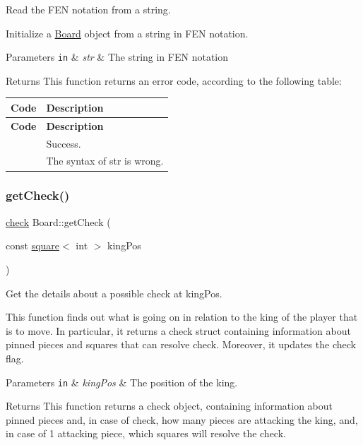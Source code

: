 Read the F\+EN notation from a string. 

Initialize a \hyperlink{classBoard}{Board} object from a string in F\+EN notation. 
\begin{DoxyParams}[1]{Parameters}
\mbox{\tt in}  & {\em str} & The string in F\+EN notation \\
\hline
\end{DoxyParams}
\begin{DoxyReturn}{Returns}
This function returns an error code, according to the following table\+: \tabulinesep=1mm
\begin{longtabu} spread 0pt [c]{*{2}{|X[-1]}|}
\hline
\rowcolor{\tableheadbgcolor}\PBS\raggedleft \textbf{ Code }&\textbf{ Description  }\\
\endfirsthead
\hline
\endfoot
\hline
\rowcolor{\tableheadbgcolor}\PBS\raggedleft \textbf{ Code }&\textbf{ Description  }\\
\endhead
\PBS{} &Success. \\
\PBS{} &The syntax of str is wrong. \\
\end{longtabu}

\end{DoxyReturn}
\mbox{\label{classBoard_afc291baf2c205a64255e8e55ffeff004}} 
\subsubsection{\texorpdfstring{get\+Check()}{getCheck()}}
{\footnotesize\ttfamily \hyperlink{structcheck}{check} Board\+::get\+Check (\begin{DoxyParamCaption}\item[{const \hyperlink{structsquare}{square}$<$ int $>$}]{king\+Pos }\end{DoxyParamCaption})\hspace{0.3cm}{\ttfamily [private]}}



Get the details about a possible check at king\+Pos. 

This function finds out what is going on in relation to the king of the player that is to move. In particular, it returns a check struct containing information about pinned pieces and squares that can resolve check. Moreover, it updates the check flag. 
\begin{DoxyParams}[1]{Parameters}
\mbox{\tt in}  & {\em king\+Pos} & The position of the king. \\
\hline
\end{DoxyParams}
\begin{DoxyReturn}{Returns}
This function returns a check object, containing information about pinned pieces and, in case of check, how many pieces are attacking the king, and, in case of 1 attacking piece, which squares will resolve the check. 
\end{DoxyReturn}
\mbox{\label{classBoard_aa70526dde51ab18ec4011c07a7e38e60}} 
